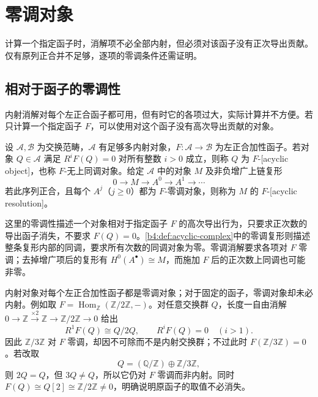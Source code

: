 
\section{零调对象}
\label{b4:sec:1003}

计算一个指定函子时，消解项不必全部内射，但必须对该函子没有正次导出贡献。仅有原列正合并不足够，逐项的零调条件还需证明。

%
%

\subsection{相对于函子的零调性}
\label{b4:subsec:1003:01}

内射消解对每个左正合函子都可用，但有时它的各项过大，实际计算并不方便。若只计算一个指定函子 \(F\)，可以使用对这个函子没有高次导出贡献的对象。

\begin{definition}\label{b4:def:functor-acyclic}
	设 \(\mathcal A,\mathcal B\) 为交换范畴，\(\mathcal A\) 有足够多内射对象，\(F:\mathcal A\to\mathcal B\) 为左正合加性函子。若对象 \(Q\in\mathcal A\) 满足 \(R^iF(Q)=0\) 对所有整数 \(i>0\) 成立，则称 \(Q\) 为 \(F\)-[acyclic object]，也称 \(F\)-无上同调对象。给定 \(\mathcal A\) 中的对象 \(M\) 及非负增广上链复形
	\[
		0\longrightarrow M\longrightarrow A^0\longrightarrow A^1\longrightarrow\cdots
	\]
	若此序列正合，且每个 \(A^j\)（\(j\ge0\)）都为 \(F\)-零调对象，则称为 \(M\) 的 \(F\)-[acyclic resolution]。
\end{definition}

这里的零调性描述一个对象相对于指定函子 \(F\) 的高次导出行为，只要求正次数的导出函子消失，不要求 \(F(Q)=0\)。\cref{b4:def:acyclic-complex}中的零调复形则描述整条复形内部的同调，要求所有次数的同调对象为零。零调消解要求各项对 \(F\) 零调；去掉增广项后的复形有 \(H^0(A^\bullet)\cong M\)，而施加 \(F\) 后的正次数上同调也可能非零。

\ProseParagraphBreak
内射对象对每个左正合加性函子都是零调对象；对于固定的函子，零调对象却未必内射。例如取 \(F=\operatorname{Hom}_{\mathbb Z}(\mathbb Z/2\mathbb Z,-)\)。对任意交换群 \(Q\)，长度一自由消解 \(0\to\mathbb Z\xrightarrow{\times2}\mathbb Z\to\mathbb Z/2\mathbb Z\to0\) 给出
\[
	R^1F(Q)\cong Q/2Q,\qquad R^iF(Q)=0\quad(i>1).
\]
因此 \(\mathbb Z/3\mathbb Z\) 对 \(F\) 零调，却因不可除而不是内射交换群；不过此时 \(F(\mathbb Z/3\mathbb Z)=0\)。若改取
\[
	Q=(\mathbb Q/\mathbb Z)\oplus\mathbb Z/3\mathbb Z,
\]
则 \(2Q=Q\)，但 \(3Q\ne Q\)，所以它仍对 \(F\) 零调而非内射。同时 \(F(Q)\cong Q[2]\cong\mathbb Z/2\mathbb Z\ne0\)，明确说明原函子的取值不必消失。

